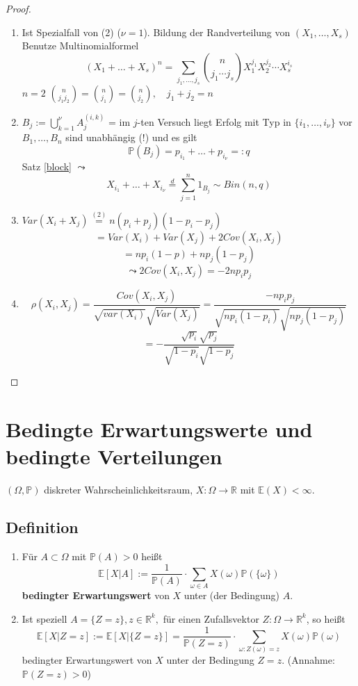 \documentclass[a4paper,11pt,notitlepage]{report}
\newcommand{\R}{{\ensuremath{\mathbb{R}}}}
\newcommand{\Prim}{{\ensuremath{\mathbb{P}}}}
\newcommand{\E}{{\ensuremath{\mathbb{E}}}}
\begin{document}
\begin{proof}
	\begin{enumerate}
		\item Ist Spezialfall von (2) ($\nu=1$).
		\newline
		Bildung der Randverteilung von $(X_1, \ldots, X_s)$
		\newline
		Benutze Multinomialformel
		$$(X_1 + \ldots + X_s)^n = \sum\limits_{j_1, \ldots, j_s}{{n \choose j_1 \cdots j_s} X_1^{j_1} X_2^{j_2} \cdots X_s^{i_s}}$$
		\underline{$n=2$} ${n \choose j_1 j_2} = {n \choose j_1} = {n \choose j_2}, \quad j_1 + j_2 = n$
		 
		 \item $B_j := \bigcup\limits_{k=1}^{\nu} {A_j^{(i,k)}}$ = im $j$-ten Versuch liegt Erfolg mit Typ in $\{i_1, \ldots, i_\nu\}$ vor
		 \newline
		 $B_1, \ldots, B_n$ sind unabhängig (!) und es gilt
		 $$\Prim(B_j) = p_{i_1} + \ldots + p_{i_\nu} =: q$$
		 Satz \ref{block} $\leadsto$
		 	$$X_{i_1} + \ldots + X_{i_\nu} \overset{d}{=} \sum\limits_{j=1}^n{1_{B_j}} \sim Bin(n, q)$$
		 \item $Var(X_i + X_j) \overset{(2)}{=} n (p_i + p_j) (1- p_i - p_j)$
		 $$= Var(X_i) + Var(X_j) + 2 Cov(X_i, X_j)$$
		 $$= n p_i (1-p) + n p_j (1-p_j)$$
		 $$\leadsto 2 Cov(X_i, X_j) = -2 n p_i p_j$$
		 
		 \item $$\rho(X_i, X_j) = \frac{Cov(X_i,X_j)}{\sqrt{var(X_i)} \sqrt{Var(X_j)}} = \frac{-n p_i p_j}{\sqrt{n p_i (1 - p_i)} \sqrt{n p_j (1-p_j)}}$$
		 $$= - \frac{\sqrt{p_i} \sqrt{p_j}}{\sqrt{1-p_i} \sqrt{1-p_j}}$$
	\end{enumerate}
\end{proof}

\chapter{Bedingte Erwartungswerte und bedingte Verteilungen}
$(\Omega, \Prim)$ diskreter Wahrscheinlichkeitsraum, $X \colon \Omega \rightarrow \R$ mit $\E (X) < \infty.$

\section{Definition}
\begin{enumerate}
	\item Für $A \subset \Omega$ mit $\Prim(A)>0$ heißt 
	$$\E[X|A] := \frac{1}{\Prim(A)} \cdot \sum\limits_{\omega \in A}{X(\omega) \Prim(\{\omega\})}$$
	\textbf{bedingter Erwartungswert} von $X$ unter (der Bedingung) $A$.
	\item Ist speziell $A = \{Z=z\}, z \in \R^k,$ für einen Zufallsvektor $Z \colon \Omega \rightarrow \R^k$, so heißt 
	$$\E [X|Z=z] := \E [X | \{Z = z \}] = \frac{1}{\Prim(Z = z)} \cdot \sum\limits_{\omega \colon Z(\omega) = z}{X(\omega) \Prim(\omega)}$$
	bedingter Erwartungswert von $X$ unter der Bedingung $Z=z$. (Annahme: $\Prim(Z = z) > 0$)
\end{enumerate}
\end{document}
